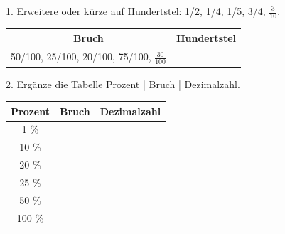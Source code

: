 \documentclass[11pt]{article}
\begin{document}
\pfheftstil
{}
\pfrueckblick
\begin{pfaufg}{}{1.}{}
Erweitere oder kürze auf Hundertstel: 1/2, 1/4, 1/5, 3/4, $\tfrac{3}{10}$.
\par\smallskip\noindent \begingroup\renewcommand{\arraystretch}{1.3}\begin{tabular}{|c|c|}\hline \textbf{Bruch} & \textbf{Hundertstel} \\ \hline 50/100, 25/100, 20/100, 75/100, $\tfrac{30}{100}$ & \rule{0pt}{3ex}\hspace{1.6cm} \\ \hline\end{tabular}\endgroup\par
{}
\end{pfaufg}
\begin{pfaufg}{}{2.}{}
Ergänze die Tabelle Prozent | Bruch | Dezimalzahl.
\par\smallskip\noindent \begingroup\renewcommand{\arraystretch}{1.3}\begin{tabular}{|c|c|c|}\hline \textbf{Prozent} & \textbf{Bruch} & \textbf{Dezimalzahl} \\ \hline 1 \% & \rule{0pt}{3ex}\hspace{1.6cm} & \rule{0pt}{3ex}\hspace{1.6cm} \\ \hline 10 \% & \rule{0pt}{3ex}\hspace{1.6cm} & \rule{0pt}{3ex}\hspace{1.6cm} \\ \hline 20 \% & \rule{0pt}{3ex}\hspace{1.6cm} & \rule{0pt}{3ex}\hspace{1.6cm} \\ \hline 25 \% & \rule{0pt}{3ex}\hspace{1.6cm} & \rule{0pt}{3ex}\hspace{1.6cm} \\ \hline 50 \% & \rule{0pt}{3ex}\hspace{1.6cm} & \rule{0pt}{3ex}\hspace{1.6cm} \\ \hline 100 \% & \rule{0pt}{3ex}\hspace{1.6cm} & \rule{0pt}{3ex}\hspace{1.6cm} \\ \hline\end{tabular}\endgroup\par
{}
\end{pfaufg}
\end{document}
